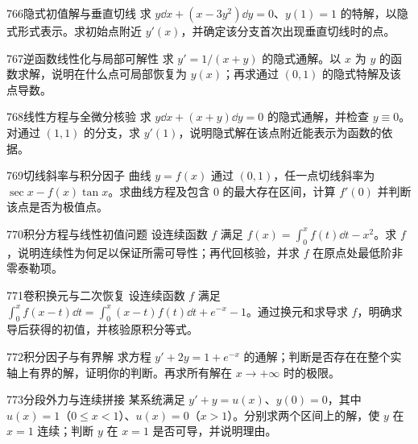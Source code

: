 \begin{exercise}{766}{隐式初值解与垂直切线}
求 $y\dd x+(x-3y^2)\dd y=0$、$y(1)=1$ 的特解，以隐式形式表示。求初始点附近 $y'(x)$，并确定该分支首次出现垂直切线时的点。
\end{exercise}
\begin{exercise}{767}{逆函数线性化与局部可解性}
求 $y'=1/(x+y)$ 的隐式通解。以 $x$ 为 $y$ 的函数求解，说明在什么点可局部恢复为 $y(x)$；再求通过 $(0,1)$ 的隐式特解及该点导数。
\end{exercise}
\begin{exercise}{768}{线性方程与全微分核验}
求 $y\dd x+(x+y)\dd y=0$ 的隐式通解，并检查 $y\equiv0$。对通过 $(1,1)$ 的分支，求 $y'(1)$，说明隐式解在该点附近能表示为函数的依据。
\end{exercise}
\begin{exercise}{769}{切线斜率与积分因子}
曲线 $y=f(x)$ 通过 $(0,1)$，任一点切线斜率为 $\sec x-f(x)\tan x$。求曲线方程及包含 $0$ 的最大存在区间，计算 $f'(0)$ 并判断该点是否为极值点。
\end{exercise}
\begin{exercise}{770}{积分方程与线性初值问题}
设连续函数 $f$ 满足 $f(x)=\int_0^xf(t)\dd t-x^2$。求 $f$，说明连续性为何足以保证所需可导性；再代回核验，并求 $f$ 在原点处最低阶非零泰勒项。
\end{exercise}
\begin{exercise}{771}{卷积换元与二次恢复}
设连续函数 $f$ 满足 $\int_0^xf(x-t)\dd t=\int_0^x(x-t)f(t)\dd t+e^{-x}-1$。通过换元和求导求 $f$，明确求导后获得的初值，并核验原积分等式。
\end{exercise}
\begin{exercise}{772}{积分因子与有界解}
求方程 $y'+2y=1+e^{-x}$ 的通解；判断是否存在在整个实轴上有界的解，证明你的判断。再求所有解在 $x\to+\infty$ 时的极限。
\end{exercise}
\begin{exercise}{773}{分段外力与连续拼接}
某系统满足 $y'+y=u(x)$、$y(0)=0$，其中 $u(x)=1$（$0\le x<1$）、$u(x)=0$（$x>1$）。分别求两个区间上的解，使 $y$ 在 $x=1$ 连续；判断 $y$ 在 $x=1$ 是否可导，并说明理由。
\end{exercise}
